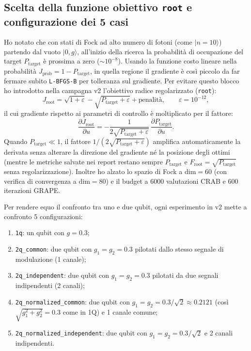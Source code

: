 \documentclass[11pt,a4paper]{article}
\begin{document}
\subsection*{Scelta della funzione obiettivo \texttt{root} e configurazione dei 5 casi}
Ho notato che con stati di Fock ad alto numero di fotoni (come $|n=10\rangle$) partendo dal vuoto $|0,g\rangle$, all'inizio della ricerca la probabilità di occupazione del target $P_{\text{target}}$ è prossima a zero ($\sim 10^{-8}$). Usando la funzione costo lineare nella probabilità $J_{\text{prob}} = 1 - P_{\text{target}}$, in quella regione il gradiente è così piccolo da far fermare subito \texttt{L-BFGS-B} per tolleranza sul gradiente. Per evitare questo blocco ho introdotto nella campagna v2 l'obiettivo radice regolarizzato (\texttt{root}):
\begin{equation}
    J_{\text{root}} = \sqrt{1 + \varepsilon} - \sqrt{P_{\text{target}} + \varepsilon} + \text{penalità}, \qquad \varepsilon = 10^{-12},
\end{equation}
il cui gradiente rispetto ai parametri di controllo è moltiplicato per il fattore:
\begin{equation}
    \frac{\partial J_{\text{root}}}{\partial u} = -\frac{1}{2\sqrt{P_{\text{target}} + \varepsilon}}\,\frac{\partial P_{\text{target}}}{\partial u}.
\end{equation}
Quando $P_{\text{target}} \ll 1$, il fattore $1/(2\sqrt{P_{\text{target}} + \varepsilon})$ amplifica automaticamente la derivata senza alterare la direzione del gradiente né la posizione degli ottimi (mentre le metriche salvate nei report restano sempre $P_{\text{target}}$ e $F_{\text{root}} = \sqrt{P_{\text{target}}}$ senza regolarizzazione). Inoltre ho alzato lo spazio di Fock a $\text{dim}=60$ (con verifica di convergenza a $\text{dim}=80$) e il budget a 6000 valutazioni CRAB e 600 iterazioni GRAPE.

\medskip
\noindent
Per rendere equo il confronto tra uno e due qubit, ogni esperimento in v2 mette a confronto 5 configurazioni:
\begin{enumerate}
    \item \texttt{1q}: un qubit con $g = 0.3$;
    \item \texttt{2q\_common}: due qubit con $g_1 = g_2 = 0.3$ pilotati dallo stesso segnale di modulazione (1 canale);
    \item \texttt{2q\_independent}: due qubit con $g_1 = g_2 = 0.3$ pilotati da due segnali indipendenti (2 canali);
    \item \texttt{2q\_normalized\_common}: due qubit con $g_1 = g_2 = 0.3/\sqrt{2} \approx 0.2121$ (così $\sqrt{g_1^2+g_2^2} = 0.3$ come in 1Q) e 1 canale comune;
    \item \texttt{2q\_normalized\_independent}: due qubit con $g_1 = g_2 = 0.3/\sqrt{2}$ e 2 canali indipendenti.
\end{enumerate}
\end{document}
